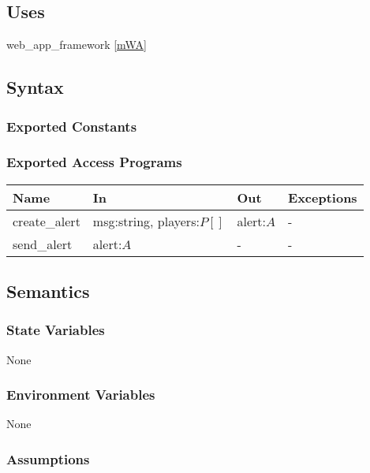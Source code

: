 \documentclass[12pt, titlepage]{article}
\begin{document}
\subsection{Uses}

web\_app\_framework \ref{mWA}

\subsection{Syntax}

\subsubsection{Exported Constants}

\subsubsection{Exported Access Programs}

\begin{center}
\begin{tabular}{p{3cm} p{5cm} p{2cm} p{2cm}}
\hline
\textbf{Name} & \textbf{In} & \textbf{Out} & \textbf{Exceptions} \\
\hline
create\_alert & msg:string, players:$P[]$ & alert:$A$ & - \\
send\_alert & alert:$A$ & - & - \\
\hline
\end{tabular}
\end{center}

\subsection{Semantics}

\subsubsection{State Variables}

None

\subsubsection{Environment Variables}

None

\subsubsection{Assumptions}

\end{document}
